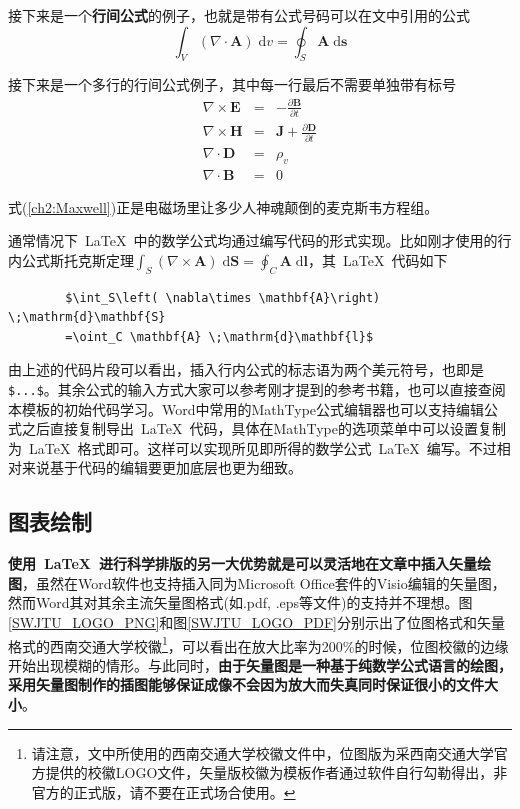 接下来是一个\textbf{行间公式}的例子，也就是带有公式号码可以在文中引用的公式
\begin{equation}\label{ch2:divTheo}
	\int_V \left( \nabla \cdot \mathbf{A} \right)  \;\mathrm{d}v = \oint_S \mathbf{A} \;\mathrm{d}\mathbf{s}
\end{equation}

接下来是一个多行的行间公式例子，其中每一行最后不需要单独带有标号
\begin{eqnarray}\label{ch2:Maxwell}
	\nabla \times \mathbf{E} &=& - \frac{\partial \mathbf{B}}{\partial t} \nonumber \\
	\nabla \times \mathbf{H} &=& \mathbf{J} + \frac{\partial \mathbf{D}}{\partial t}  \nonumber \\
	\nabla \cdot \mathbf{D} &=& \rho_v \nonumber \\
	\nabla \cdot \mathbf{B} &=& 0
\end{eqnarray}

式(\ref{ch2:Maxwell})正是电磁场里让多少人神魂颠倒的麦克斯韦方程组。

通常情况下~\LaTeX{}~中的数学公式均通过编写代码的形式实现。比如刚才使用的行内公式斯托克斯定理$\int_S\left( \nabla\times \mathbf{A}\right)  \;\mathrm{d}\mathbf{S}=\oint_C \mathbf{A} \;\mathrm{d}\mathbf{l}$，其~\LaTeX{}~代码如下

\begin{framed}
	\begin{verbatim}
		$\int_S\left( \nabla\times \mathbf{A}\right)  \;\mathrm{d}\mathbf{S}
		=\oint_C \mathbf{A} \;\mathrm{d}\mathbf{l}$
	\end{verbatim}
\end{framed}


由上述的代码片段可以看出，插入行内公式的标志语为两个美元符号，也即是\verb|$...$|。其余公式的输入方式大家可以参考刚才提到的参考书籍，也可以直接查阅本模板的初始代码学习。Word中常用的MathType公式编辑器也可以支持编辑公式之后直接复制导出~\LaTeX{}~代码，具体在MathType的选项菜单中可以设置复制为~\LaTeX{}~格式即可。这样可以实现所见即所得的数学公式~\LaTeX{}~编写。不过相对来说基于代码的编辑要更加底层也更为细致。

\subsection{图表绘制}
\textbf{使用~\LaTeX{}~进行科学排版的另一大优势就是可以灵活地在文章中插入矢量绘图}，虽然在Word软件也支持插入同为Microsoft Office套件的Visio编辑的矢量图，然而Word其对其余主流矢量图格式(如.pdf, .eps等文件)的支持并不理想。图\ref{SWJTU_LOGO_PNG}和图\ref{SWJTU_LOGO_PDF}分别示出了位图格式和矢量格式的西南交通大学校徽\footnote{请注意，文中所使用的西南交通大学校徽文件中，位图版为采西南交通大学官方提供的校徽LOGO文件，矢量版校徽为模板作者通过软件自行勾勒得出，非官方的正式版，请不要在正式场合使用。}，可以看出在放大比率为200\%的时候，位图校徽的边缘开始出现模糊的情形。与此同时，\textbf{由于矢量图是一种基于纯数学公式语言的绘图，采用矢量图制作的插图能够保证成像不会因为放大而失真同时保证很小的文件大小}。


